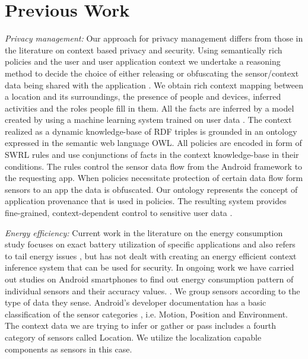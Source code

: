 \documentclass{ubicomp2013}
\begin{document}
\section{Previous Work}
{\em Privacy management:} Our approach for privacy management differs from those in the literature \cite{conti2011crepe, sadeh2003mycampus, enck2010taintdroid} on context based privacy and security.  Using semantically rich policies and the user and user application context we undertake a reasoning method to decide the choice of either releasing or obfuscating the sensor/context data being shared with the application \cite{ghosh2012ms, ghosh2012privacy, palani2012infoflow}. We obtain rich context mapping between a location and its surroundings, the presence of people and devices, inferred activities and the roles people fill in them. All the facts are inferred by a model created by using a machine learning system trained on user data \cite{zavala2011mobile}. The context realized as a dynamic knowledge-base of RDF triples is grounded in an ontology expressed in the semantic web language OWL. All policies are encoded in form of SWRL \cite{horrocks2004swrl} rules and use conjunctions of facts in the context knowledge-base in their conditions. The rules control the sensor data flow from the Android framework to the requesting app. When policies necessitate protection of certain data flow form sensors to an app the data is obfuscated. Our ontology represents the concept of application provenance that is used in policies. The resulting system provides fine-grained, context-dependent control to sensitive user data \cite{ghosh2012ms}. 

{\em Energy efficiency:} Current work in the literature on the energy
consumption study focuses on exact battery utilization of specific
applications and also refers to tail energy issues
\cite{pathak2011finegrainedenergy}, but has not dealt with creating an
energy efficient context inference system that can be used for
security.  In ongoing work we have carried out studies on Android
smartphones to find out energy consumption pattern of individual
sensors and their accuracy values. \cite{das2012energy}. We group
sensors according to the type of data they sense. Android's developer
documentation has a basic classification of the sensor categories
\cite{android2013sesnors}, i.e. Motion, Position and Environment. The
context data we are trying to infer or gather or pass includes a
fourth category of sensors called Location. We utilize the
localization capable components as sensors in this case.
\end{document}
